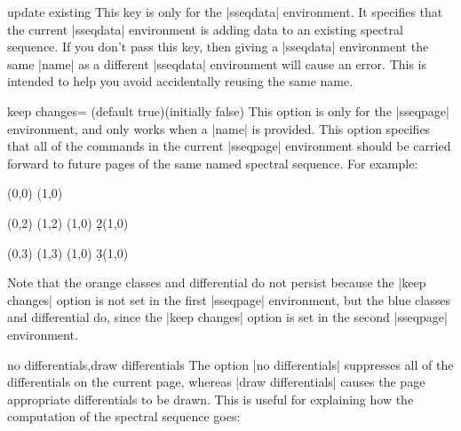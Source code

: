 \documentclass{ltxdoc}
\begin{document}
\begin{sseqdata}[name=ex1,degree={#1}{1-#1}]
\begin{key}{update existing}
This key is only for the |sseqdata| environment. It specifies that the current |sseqdata| environment is adding data to an existing spectral sequence. If you don't pass this key, then giving a |sseqdata| environment the same |name| as a different |sseqdata| environment will cause an error. This is intended to help you avoid accidentally reusing the same name.
\end{key}


\begin{key}{keep changes= (default true)(initially false)}
This option is only for the |sseqpage| environment, and only works when a |name| is provided.
This option specifies that all of the commands in the current |sseqpage| environment should be carried forward to future pages of the same named spectral sequence. For example:
\begin{codeexample}[]
\begin{sseqdata}[name=keep changes example,Adams grading,y range={0}{3}]
\class(0,0)
\class(1,0)
\end{sseqdata}

\begin{sseqpage}[name=keep changes example,paths=orange]
\class(0,2)
\class(1,2)
\classoptions[orange](1,0)
\d2(1,0)
\end{sseqpage}
%
\hskip1cm
%
\begin{sseqpage}[name=keep changes example,paths=blue,keep changes]
\class(0,3)
\class(1,3)
\classoptions[blue](1,0)
\d3(1,0)
\end{sseqpage}
%
\hskip1cm
%
\printpage[name=keep changes example,page=3]
\end{codeexample}
Note that the orange classes and differential do not persist because the |keep changes| option is not set in the first |sseqpage| environment, but the blue classes and differential do, since the |keep changes| option is set in the second |sseqpage| environment.
\end{key}

\begin{keylist}{no differentials,draw differentials}
The option |no differentials| suppresses all of the differentials on the current page, whereas |draw differentials| causes the page appropriate differentials to be drawn. This is useful for explaining how the computation of the spectral sequence goes:
\end{keylist}


\end{sseqdata}
\end{document}
